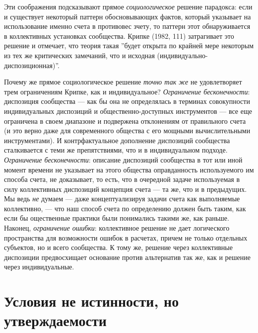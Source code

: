 \documentclass[11pt]{book}
\begin{document}
Эти соображения подсказывают прямое \textit{социологическое} решение парадокса: если и существует некоторый паттерн обосновывающих фактов, который указывает на использование именно счета в противовес зчету, то паттерн этот обнаруживается в коллективных установках сообщества. Крипке (1982, 111) затрагивает это решение и отмечает, что теория такая ''будет открыта по крайней мере некоторым из тех же критических замечаний, что и исходная (индивидуально-диспозиционная)''.

Почему же прямое социологическое решение \textit{точно так же} не удовлетворяет трем ограничениям Крипке, как и индивидуальное? \textit{Ограничение бесконечности}: диспозиция сообщества --- как бы она не определялась в терминах совокупности индивидуальных диспозиций и общественно-доступных инструментов --- все еще ограничена в своем диапазоне и подвержена отклонениям от правильного счета (и это верно даже для современного общества с его мощными вычислительными инструментами). И контрфактуальное дополнение диспозиций сообщества сталкивается с теми же препятствиями, что и в индивидуальном подходе. \textit{Ограничение бесконечности}: описание диспозиций сообщества в тот или иной момент времени не указывает на этого общества оправданность используемого им способа счета, не доказывает, то есть, что в очередной задаче используемая в силу коллективных диспозиций концепция счета --- та же, что и в предыдущих. Мы ведь \textit{не} думаем --- даже концептуализируя задачи счета как выполняемые коллективно, --- что наш способ счета по определению должен быть таким, как если бы ощественные практики были понимались такими же, как раньше. Наконец, \textit{ограничение ошибки}: коллективное решение не дает логического пространства для возможности ошибок в расчетах, причем не только отдельных субъектов, но и всего сообщества. К тому же, решение через коллективные диспозиции предвосхищает основание против альтернатив так же, как и решение через индивидуальные.

\section{Условия не истинности, но утверждаемости}
\end{document}
